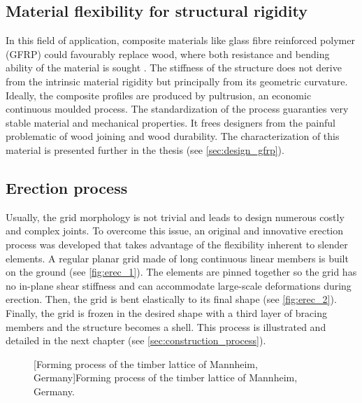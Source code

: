 \subsection{Material flexibility for structural rigidity}\label{sec:def_flexibility}
In this field of application, composite materials like glass fibre reinforced polymer (GFRP) could favourably replace wood, where both resistance and bending ability of the material is sought \cite{Douthe2010a}. The stiffness of the structure does not derive from the intrinsic material rigidity but principally from its geometric curvature. Ideally, the composite profiles are produced by pultrusion, an economic continuous moulded process. The standardization of the process guaranties very stable material and mechanical properties. It frees designers from the painful problematic of wood joining and wood durability. The characterization of this material is presented further in the thesis (see \cref{sec:design_gfrp}).

\subsection{Erection process}\label{sec:def_erec}
Usually, the grid morphology is not trivial and leads to design numerous costly and complex joints. To overcome this issue, an original and innovative erection process was developed that takes advantage of the flexibility inherent to slender elements. A regular planar grid made of long continuous linear members is built on the ground (see \cref{fig:erec_1}). The elements are pinned together so the grid has no in-plane shear stiffness and can accommodate large-scale deformations during erection. Then, the grid is bent elastically to its final shape (see \cref{fig:erec_2}). Finally, the grid is frozen in the desired shape with a third layer of bracing members and the structure becomes a shell. This process is illustrated and detailed in the next chapter (see \cref{sec:construction_process}).

\begin{figure}[t]
		\hspace*{\fill}
		\vspace{10pt}
		[Forming process of the timber lattice of Mannheim, Germany]{Forming process of the timber lattice of Mannheim, Germany.}
		\label{fig:multihalle}    
\end{figure}

